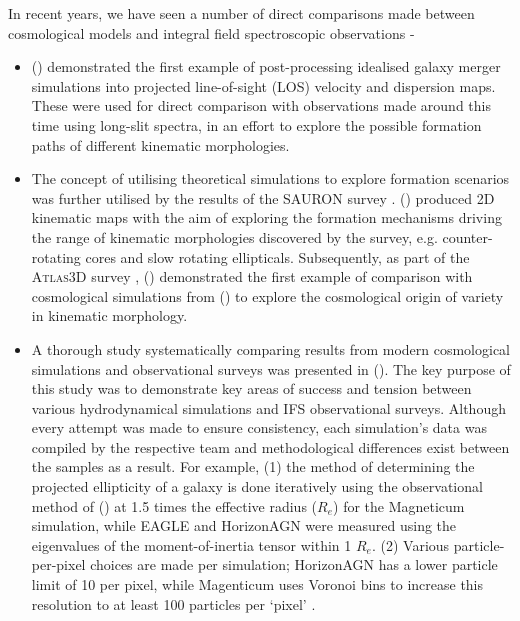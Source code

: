 \documentclass[
  journal=pasa,
  manuscript=research-paper, %
  year=2020,
  volume=37,
]{cup-journal}
\newcommand{\citetoggle}[1]{\citeauthor{#1} (\citeyear{#1})}
\begin{document}
In recent years, we have seen a number of direct comparisons made between cosmological models and integral field spectroscopic observations -
\begin{itemize}
    \item \citetoggle{Bendo2000Theremnants} demonstrated the first example of post-processing idealised galaxy merger simulations into projected line-of-sight (LOS) velocity and dispersion maps. 
    These were used for direct comparison with observations made around this time using long-slit spectra, in an effort to explore the possible formation paths of different kinematic morphologies. 
    \item The concept of utilising theoretical simulations to explore formation scenarios was further utilised by the results of the SAURON survey \citep{Bacon2001TheSpectrograph, deZeeuw2002TheResults, Emsellem2004TheGalaxies}. \citeauthor{Jesseit20072Dremnants} (\citeyear{Jesseit20072Dremnants, Jesseit2009Specificlambda_R-Parameter}) produced 2D kinematic maps with the aim of exploring the formation mechanisms driving the range of kinematic morphologies discovered by the survey, e.g. counter-rotating cores and slow rotating ellipticals. Subsequently, as part of the \textsc{Atlas3D} survey \citep{Cappellari2011Atlas3DIOverview}, \citetoggle{Naab2014TheRotators} demonstrated the first example of comparison with cosmological simulations from \citetoggle{Oser2010TheFormation} to explore the cosmological origin of variety in kinematic morphology.  
    \item A thorough study systematically comparing results from modern cosmological simulations and observational surveys was presented in  \citetoggle{vandeSande2019TheSimulations}. The key purpose of this study was to demonstrate key areas of success and tension between various hydrodynamical simulations and IFS observational surveys. Although every attempt was made to ensure consistency, each simulation's data was compiled by the respective team and methodological differences exist between the samples as a result. For example, (1) the method of determining the projected ellipticity of a galaxy is done iteratively using the observational method of \citetoggle{Cappellari2007TheKinematics} at 1.5 times the effective radius ($R_e$) for the Magneticum simulation, while EAGLE and HorizonAGN were measured using the eigenvalues of the moment-of-inertia tensor within 1 $R_e$. (2) Various particle-per-pixel choices are made per simulation; HorizonAGN has a lower particle limit of 10 per pixel, while Magenticum uses Voronoi bins to increase this resolution to at least 100 particles per `pixel' \citep{Schulze2018KinematicsRedshifts}.
\end{itemize}
\end{document}
